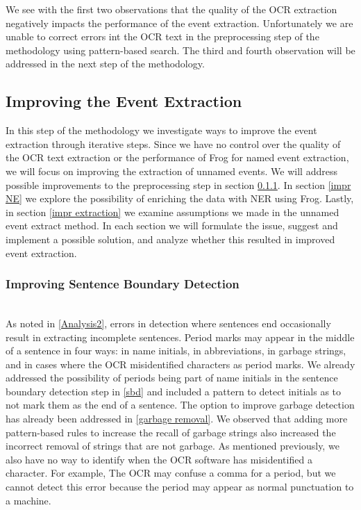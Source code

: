 \documentclass[a4paper, 10pt, conference]{ieeeconf}      %
\begin{document}
We see with the first two observations that the quality of the OCR extraction negatively impacts the performance of the event extraction. Unfortunately we are unable to correct errors int the OCR text in the preprocessing step of the methodology using pattern-based search. The third and fourth observation will be addressed in the next step of the methodology.


\subsection{Improving the Event Extraction}\label{improving}
In this step of the methodology we investigate ways to improve the event extraction through iterative steps. Since we have no control over the quality of the OCR text extraction or the performance of Frog for named event extraction, we will focus on improving the extraction of unnamed events. We will address possible improvements to the preprocessing step in section \ref{impr sbd}. In section \ref{impr NE} we explore the possibility of enriching the data with NER using Frog. Lastly, in section \ref{impr extraction} we examine assumptions we made in the unnamed event extract method. In each section we will formulate the issue, suggest and implement a possible solution, and analyze whether this resulted in improved event extraction.

\subsubsection{Improving Sentence Boundary Detection}\label{impr sbd}~\\
As noted in \ref{Analysis2}, errors in detection where sentences end occasionally result in extracting incomplete sentences. Period marks may appear in the middle of a sentence in four ways: in name initials, in abbreviations, in garbage strings, and in cases where the OCR misidentified characters as period marks. We already addressed the possibility of periods being part of name initials in the sentence boundary detection step in \ref{sbd} and included a pattern to detect initials as to not mark them as the end of a sentence. The option to improve garbage detection has already been addressed in \ref{garbage removal}. We observed that adding more pattern-based rules to increase the recall of garbage strings also increased the incorrect removal of strings that are not garbage. As mentioned previously, we also have no way to identify when the OCR software has misidentified a character. For example, The OCR may confuse a comma for a period, but we cannot detect this error because the period may appear as normal punctuation to a machine. 
\end{document}
